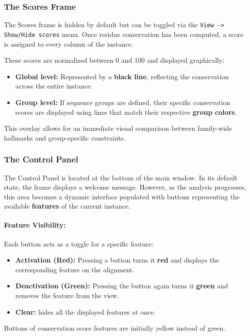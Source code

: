 \documentclass[a4paper]{article}
\begin{document}
\subsubsection{The Scores Frame}
The Scores frame is hidden by default but can be toggled via the \texttt{View -> Show/Hide scores} menu. Once residue conservation has been computed, a score is assigned to every column of the instance. 

These scores are normalized between 0 and 100 and displayed graphically:
\begin{itemize}
    \item \textbf{Global level:} Represented by a \textbf{black line}, reflecting the conservation across the entire instance.
    \item \textbf{Group level:} If sequence groups are defined, their specific conservation scores are displayed using lines that match their respective \textbf{group colors}.
\end{itemize}

This overlay allows for an immediate visual comparison between family-wide hallmarks and group-specific constraints.

\subsubsection{The Control Panel}
The Control Panel is located at the bottom of the main window. In its default state, the frame displays a welcome message. However, as the analysis progresses, this area becomes a dynamic interface populated with buttons representing the available \textbf{features} of the current instance.

\paragraph{Feature Visibility:}
Each button acts as a toggle for a specific feature:
\begin{itemize}
    \item \textbf{Activation (Red):} Pressing a button turns it \textbf{red} and displays the corresponding feature on the alignment.
    \item \textbf{Deactivation (Green):} Pressing the button again turns it \textbf{green} and removes the feature from the view.
    \item \textbf{Clear:} hides all the displayed features at once.
\end{itemize}
Buttons of conservation score features are initially yellow instead of green.
\end{document}
